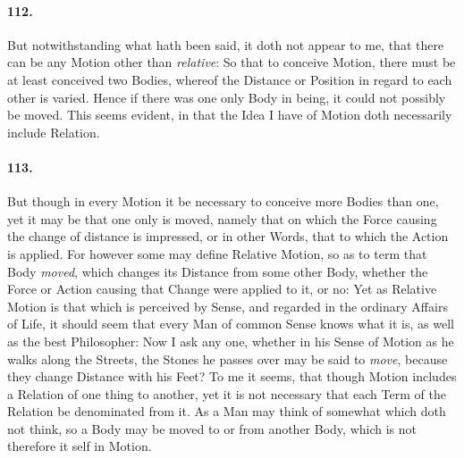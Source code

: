 \documentclass[]{article}
\newenvironment{sectionbody}{}{}
\begin{document}
\begin{sectionbody}
\paragraph{112.} But notwithstanding what hath been said, it doth not appear to
me, that there can be any Motion other than \emph{relative}: So
that to conceive Motion, there must be at least conceived two
Bodies, whereof the Distance or Position in regard to each other
is varied.  Hence if there was one only Body in being, it could
not possibly be moved.  This seems evident, in that the Idea I
have of Motion doth necessarily include Relation.



\paragraph{113.} But though in every Motion it be necessary to conceive more
Bodies than one, yet it may be that one only is moved, namely
that on which the Force causing the change of distance is
impressed, or in other Words, that to which the Action is
applied.  For however some may define Relative Motion, so as to
term that Body \emph{moved}, which changes its Distance from
some other Body, whether the Force or Action causing that Change
were applied to it, or no: Yet as Relative Motion is that which
is perceived by Sense, and regarded in the ordinary Affairs of
Life, it should seem that every Man of common Sense knows what it
is, as well as the best Philosopher: Now I ask any one, whether
in his Sense of Motion as he walks along the Streets, the Stones
he passes over may be said to \emph{move}, because they change
Distance with his Feet? To me it seems, that though Motion
includes a Relation of one thing to another, yet it is not
necessary that each Term of the Relation be denominated from it.
As a Man may think of somewhat which doth not think, so a Body
may be moved to or from another Body, which is not therefore it
self in Motion.




\end{sectionbody}
\end{document}
